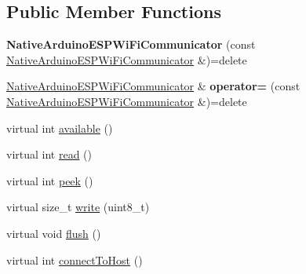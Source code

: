 \subsection*{Public Member Functions}
\begin{DoxyCompactItemize}
\item 
\mbox{\label{classathome_1_1communication_1_1wifi_1_1_native_arduino_e_s_p_wi_fi_communicator_a96875f73157ad5b6f6b903a97638fe05}} 
{\bfseries Native\+Arduino\+E\+S\+P\+Wi\+Fi\+Communicator} (const \mbox{\hyperlink{classathome_1_1communication_1_1wifi_1_1_native_arduino_e_s_p_wi_fi_communicator}{Native\+Arduino\+E\+S\+P\+Wi\+Fi\+Communicator}} \&)=delete
\item 
\mbox{\label{classathome_1_1communication_1_1wifi_1_1_native_arduino_e_s_p_wi_fi_communicator_a66d9b6a546ec4c054d71a6635a99d2e2}} 
\mbox{\hyperlink{classathome_1_1communication_1_1wifi_1_1_native_arduino_e_s_p_wi_fi_communicator}{Native\+Arduino\+E\+S\+P\+Wi\+Fi\+Communicator}} \& {\bfseries operator=} (const \mbox{\hyperlink{classathome_1_1communication_1_1wifi_1_1_native_arduino_e_s_p_wi_fi_communicator}{Native\+Arduino\+E\+S\+P\+Wi\+Fi\+Communicator}} \&)=delete
\item 
virtual int \mbox{\hyperlink{classathome_1_1communication_1_1wifi_1_1_native_arduino_e_s_p_wi_fi_communicator_a6cd3fe64efeb1085c7e6dc71a740a24b}{available}} ()
\item 
virtual int \mbox{\hyperlink{classathome_1_1communication_1_1wifi_1_1_native_arduino_e_s_p_wi_fi_communicator_a07da3b2bf99edad18fb95b6879dbf0f7}{read}} ()
\item 
virtual int \mbox{\hyperlink{classathome_1_1communication_1_1wifi_1_1_native_arduino_e_s_p_wi_fi_communicator_adaa14eb4aa1b147531742c9377aa8db0}{peek}} ()
\item 
virtual size\+\_\+t \mbox{\hyperlink{classathome_1_1communication_1_1wifi_1_1_native_arduino_e_s_p_wi_fi_communicator_a99fab41ad5275649efafa0a776a0348f}{write}} (uint8\+\_\+t)
\item 
virtual void \mbox{\hyperlink{classathome_1_1communication_1_1wifi_1_1_native_arduino_e_s_p_wi_fi_communicator_a5b02865d3bf418d1b4dff8a1198c8dac}{flush}} ()
\item 
virtual int \mbox{\hyperlink{classathome_1_1communication_1_1wifi_1_1_native_arduino_e_s_p_wi_fi_communicator_ab3f6a0e1b9d3be98a876f95dde97976b}{connect\+To\+Host}} ()

\end{DoxyCompactItemize}
